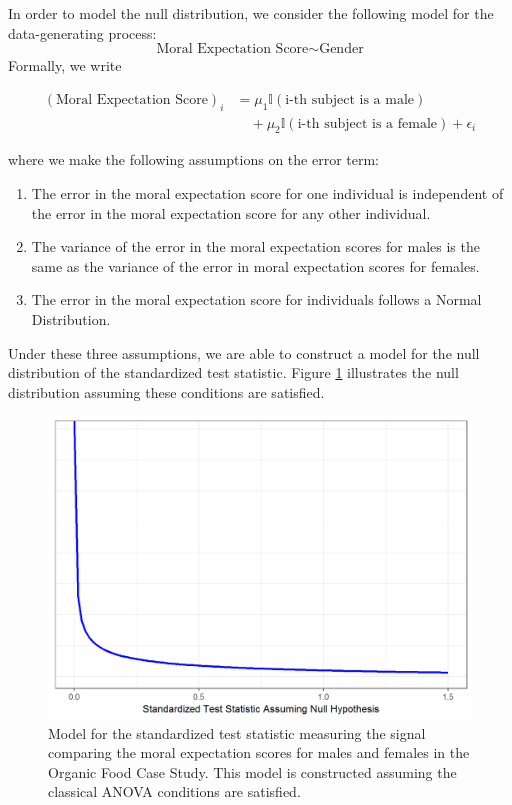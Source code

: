 \documentclass[]{book}
\providecommand{\tightlist}{%
  \setlength{\itemsep}{0pt}\setlength{\parskip}{0pt}}
\theoremstyle{definition}
\theoremstyle{definition}
\theoremstyle{remark}
\begin{document}
In order to model the null distribution, we consider the following model
for the data-generating process:
\[\text{Moral Expectation Score} \sim \text{Gender}\] Formally, we write

\begin{equation}
  \begin{split}
    (\text{Moral Expectation Score})_i & = \mu_1\mathbb{I}(\text{i-th subject is a male}) \\
      & \quad + \mu_2\mathbb{I}(\text{i-th subject is a female}) + \epsilon_i
  \end{split}
  \label{eq:anovarecap-model}
\end{equation}

where we make the following assumptions on the error term:

\begin{enumerate}
\def\labelenumi{\arabic{enumi}.}
\tightlist
\item
  The error in the moral expectation score for one individual is
  independent of the error in the moral expectation score for any other
  individual.
\item
  The variance of the error in the moral expectation scores for males is
  the same as the variance of the error in moral expectation scores for
  females.
\item
  The error in the moral expectation score for individuals follows a
  Normal Distribution.
\end{enumerate}

Under these three assumptions, we are able to construct a model for the
null distribution of the standardized test statistic. Figure
\ref{fig:anovarecap-classical-null-model} illustrates the null
distribution assuming these conditions are satisfied.

\begin{figure}

{\centering \includegraphics[width=0.8\linewidth]{./Images/anovarecap-classical-null-model-1} 

}

\caption{Model for the standardized test statistic measuring the signal comparing the moral expectation scores for males and females in the Organic Food Case Study.  This model is constructed assuming the classical ANOVA conditions are satisfied.}\label{fig:anovarecap-classical-null-model}
\end{figure}
\end{document}
